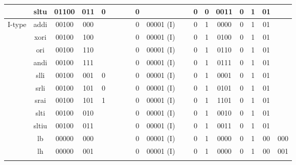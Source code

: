 \documentclass[12pt,a4paper,oneside]{book} %
\begin{document}
\begin{landscape}
\begin{table}[H]
{\begin{tabular}{|c|c|c|c|c|c|c|c|c|c|c|c|c|c|c|c|c|}
                         & sltu   & 01100     & 011         & 0        & ~    & ~    & 0     & ~       & ~    & 0    & 0    & 0011   & 0     & 1      & 01    & ~       \\ \hline
\multirow{14}{*}{I-type}  & addi   & 00100     & 000         & ~        & ~    & ~    & 0     & 00001 (I) & ~    & 0    & 1    & 0000   & 0     & 1      & 01    & ~       \\ \cline{2-17} 
                         & xori   & 00100     & 100         & ~        & ~    & ~    & 0     & 00001 (I) & ~    & 0    & 1    & 0100   & 0     & 1      & 01    & ~       \\ \cline{2-17} 
                         & ori    & 00100     & 110         & ~        & ~    & ~    & 0     & 00001 (I) & ~    & 0    & 1    & 0110   & 0     & 1      & 01    & ~       \\ \cline{2-17} 
                         & andi   & 00100     & 111         & ~        & ~    & ~    & 0     & 00001 (I) & ~    & 0    & 1    & 0111   & 0     & 1      & 01    & ~       \\ \cline{2-17} 
                         & slli   & 00100     & 001         & 0        & ~    & ~    & 0     & 00001 (I) & ~    & 0    & 1    & 0001   & 0     & 1      & 01    & ~       \\ \cline{2-17} 
                         & srli   & 00100     & 101         & 0        & ~    & ~    & 0     & 00001 (I) & ~    & 0    & 1    & 0101   & 0     & 1      & 01    & ~       \\ \cline{2-17} 
                         & srai   & 00100     & 101         & 1        & ~    & ~    & 0     & 00001 (I) & ~    & 0    & 1    & 1101   & 0     & 1      & 01    & ~       \\ \cline{2-17} 
                         & slti   & 00100     & 010         & ~        & ~    & ~    & 0     & 00001 (I) & ~    & 0    & 1    & 0010   & 0     & 1      & 01    & ~       \\ \cline{2-17} 
                         & sltiu  & 00100     & 011         & ~        & ~    & ~    & 0     & 00001 (I) & ~    & 0    & 1    & 0011   & 0     & 1      & 01    & ~       \\ \cline{2-17} 
                         & lb     & 00000     & 000         & ~        & ~    & ~    & 0     & 00001 (I) & ~    & 0    & 1    & 0000   & 0     & 1      & 00    & 000     \\ \cline{2-17} 
                         & lh     & 00000     & 001         & ~        & ~    & ~    & 0     & 00001 (I) & ~    & 0    & 1    & 0000   & 0     & 1      & 00    & 001     \\ \cline{2-17} 

\end{tabular}}
\end{table}
\end{landscape}
\end{document}
